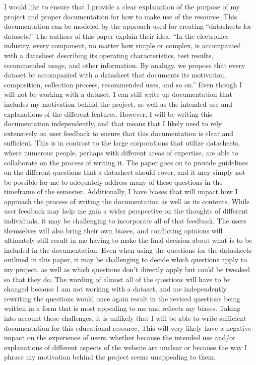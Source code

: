 \documentclass[10pt,twocolumn]{article}
\begin{document}
I would like to ensure that I provide a clear explanation of the purpose of my project and proper documentation for how to make use of the resource. This documentation can be modeled by the approach used for creating “datasheets for datasets.” The authors of this paper explain their idea: “In the electronics industry, every component, no matter how simple or complex, is accompanied with a datasheet describing its operating characteristics, test results, recommended usage, and other information. By analogy, we propose that every dataset be accompanied with a datasheet that documents its motivation, composition, collection process, recommended uses, and so on.”\cite{Datasheets} Even though I will not be working with a dataset, I can still write up documentation that includes my motivation behind the project, as well as the intended use and explanations of the different features. However, I will be writing this documentation independently, and that means that I likely need to rely extensively on user feedback to ensure that this documentation is clear and sufficient. This is in contrast to the large corporations that utilize datasheets, where numerous people, perhaps with different areas of expertise, are able to collaborate on the process of writing it. The paper goes on to provide guidelines on the different questions that a datasheet should cover, and it may simply not be possible for me to adequately address many of these questions in the timeframe of the semester. Additionally, I have biases that will impact how I approach the process of writing the documentation as well as its contents. While user feedback may help me gain a wider perspective on the thoughts of different individuals, it may be challenging to incorporate all of that feedback. The users themselves will also bring their own biases, and conflicting opinions will ultimately still result in me having to make the final decision about what is to be included in the documentation. Even when using the questions for the datasheets outlined in this paper, it may be challenging to decide which questions apply to my project, as well as which questions don’t directly apply but could be tweaked so that they do. The wording of almost all of the questions will have to be changed because I am not working with a dataset, and me independently rewriting the questions would once again result in the revised questions being written in a form that is most appealing to me and reflects my biases. Taking into account these challenges, it is unlikely that I will be able to write sufficient documentation for this educational resource. This will very likely have a negative impact on the experience of users, whether because the intended use and/or explanations of different aspects of the website are unclear or because the way I phrase my motivation behind the project seems unappealing to them.
\end{document}
